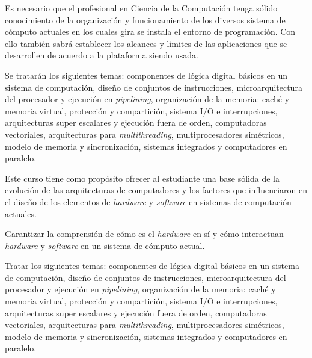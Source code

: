 \begin{syllabus}


\begin{justification}
Es necesario que el profesional en Ciencia de la Computación tenga sólido  conocimiento de la organización y funcionamiento de los diversos sistema de cómputo actuales en los cuales gira se instala el entorno de programación. Con ello también sabrá establecer los alcances y límites de las aplicaciones que se desarrollen de acuerdo a la plataforma siendo usada.

Se tratarán los siguientes temas: componentes de lógica digital básicos en un sistema de computación, diseño de conjuntos de instrucciones, microarquitectura del procesador y ejecución en \textit{pipelining}, organización de la memoria: caché y memoria virtual, protección y compartición, sistema I/O e interrupciones, arquitecturas super escalares y ejecución fuera de orden, computadoras vectoriales, arquitecturas para \textit{multithreading}, multiprocesadores simétricos, modelo de memoria y sincronización, sistemas integrados y computadores en paralelo.

\end{justification}

\begin{goals}
\item Este curso tiene como propósito ofrecer al estudiante una base sólida de la evolución de las arquitecturas de computadores y los factores que influenciaron en el diseño de los elementos de \textit{hardware} y \textit{software} en sistemas de computación actuales. 
\item Garantizar la comprensión de cómo es el \textit{hardware} en sí­ y cómo interactuan \textit{hardware} y \textit{software} en un sistema de cómputo actual.
\item Tratar los siguientes temas: componentes de lógica digital básicos en un sistema de computación, diseño de conjuntos de instrucciones, microarquitectura del procesador y ejecución en \textit{pipelining}, organización de la memoria: caché y memoria virtual, protección y compartición, sistema I/O e interrupciones, arquitecturas super escalares y ejecución fuera de orden, computadoras vectoriales, arquitecturas para \textit{multithreading}, multiprocesadores simétricos, modelo de memoria y sincronización, sistemas integrados y computadores en paralelo.
\end{goals}


\end{syllabus}
